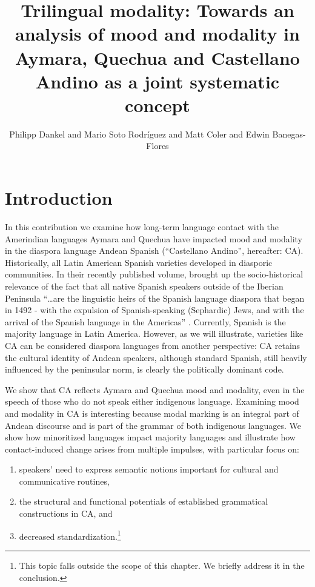 \documentclass[output=paper,hidelinks]{langscibook}
\author{Philipp Dankel\affiliation{University of Basel} and Mario Soto Rodr\'{i}guez\affiliation{University of Freiburg} and Matt Coler\affiliation{University of Groningen -- Campus Fryslân} and Edwin Banegas-Flores\affiliation{Peruvian Ministry of Education}
}
\title{Trilingual modality: Towards an analysis of mood and modality in Aymara, Quechua and Castellano Andino as a joint systematic concept}
\begin{document}
\maketitle

\section{Introduction}
In this contribution we examine how long-term language contact with the Amerindian languages Aymara and Quechua have impacted mood and modality in the diaspora language Andean Spanish (“Castellano Andino”, hereafter: CA). Historically, all Latin American Spanish varieties developed in diasporic communities. In their recently published volume, \citet{drinka2021spanish} brought up the socio-historical relevance of the fact that all native Spanish speakers outside of the Iberian Peninsula ``\ldots are the linguistic heirs of the Spanish language diaspora that began in 1492 - with the expulsion of Spanish-speaking (Sephardic) Jews, and with the arrival of the Spanish language in the Americas'' \citep[550]{lipski2010spanish}. Currently, Spanish is the majority language in Latin America. However, as we will illustrate, varieties like CA can be considered diaspora languages from another perspective: CA retains the cultural identity of Andean speakers, although standard Spanish, still heavily influenced by the peninsular norm, is clearly the politically dominant code. 


We show that CA reflects Aymara and Quechua mood and modality, even in the speech of those who do not speak either indigenous language. Examining mood and modality in CA is interesting because modal marking is an integral part of Andean discourse and is part of the grammar of both indigenous languages. We show how minoritized languages impact majority languages and illustrate how contact-induced change arises from multiple impulses, with particular focus on:

\begin{enumerate}
    \item speakers’ need to express semantic notions important for cultural and communicative routines,
    \item the structural and functional potentials of established grammatical constructions in CA, and
    \item decreased standardization.\footnote{This topic falls outside the scope of this chapter. We briefly address it in the conclusion.}
\end{enumerate}
\end{document}
